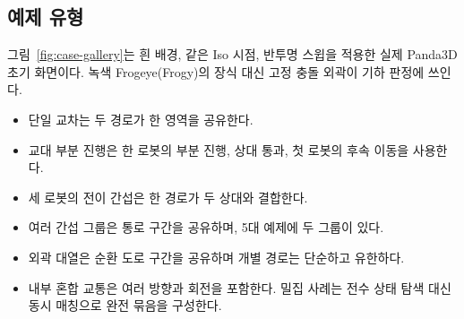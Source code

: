\documentclass[11pt,a4paper]{article}
\theoremstyle{remark}
\begin{document}
\subsection{예제 유형}
그림~\ref{fig:case-gallery}는 흰 배경, 같은 Iso 시점, 반투명 스윕을 적용한 실제 Panda3D 초기 화면이다. 녹색 Frogeye(Frogy)의 장식 대신 고정 충돌 외곽이 기하 판정에 쓰인다.
\begin{itemize}
\item 단일 교차는 두 경로가 한 영역을 공유한다.
\item 교대 부분 진행은 한 로봇의 부분 진행, 상대 통과, 첫 로봇의 후속 이동을 사용한다.
\item 세 로봇의 전이 간섭은 한 경로가 두 상대와 결합한다.
\item 여러 간섭 그룹은 통로 구간을 공유하며, 5대 예제에 두 그룹이 있다.
\item 외곽 대열은 순환 도로 구간을 공유하며 개별 경로는 단순하고 유한하다.
\item 내부 혼합 교통은 여러 방향과 회전을 포함한다. 밀집 사례는 전수 상태 탐색 대신 동시 매칭으로 완전 묶음을 구성한다.
\end{itemize}
\end{document}
